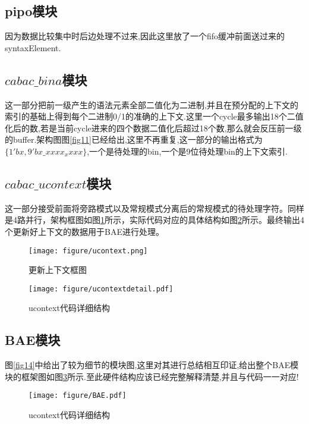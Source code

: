 \documentclass[UTF8,a4paper,12pt]{ctexart}
\begin{document}
\subsection{pipo模块}
因为数据比较集中时后边处理不过来,因此这里放了一个fifo缓冲前面送过来的syntaxElement.

\subsection{$cabac\_bina$模块}
这一部分把前一级产生的语法元素全部二值化为二进制,并且在预分配的上下文的索引的基础上得到每个二进制0/1的准确的上下文.这里一个cycle最多输出18个二值化后的数,若是当前cycle进来的四个数据二值化后超过18个数,那么就会反压前一级的buffer.架构图图\ref{fig11}已经给出,这里不再重复,这一部分的输出格式为$\{1'bx,9'bx\_xxxx_xxxx\}$,一个是待处理的bin,一个是9位待处理bin的上下文索引.

\subsection{$cabac\_ucontext$模块}
这一部分接受前面将旁路模式以及常规模式分离后的常规模式的待处理字符。同样是4路并行，架构框图如图\ref{fig15}所示，实际代码对应的具体结构如图\ref{fig16}所示。最终输出4个更新好上下文的数据用于BAE进行处理。
\begin{figure}[H]
\centering
\texttt{[image: figure/ucontext.png]}
\caption{更新上下文框图}\label{fig15}
\end{figure}

\begin{figure}[H]
\centering
\texttt{[image: figure/ucontextdetail.pdf]}
\caption{ucontext代码详细结构}\label{fig16}
\end{figure}

\subsection{BAE模块}
图\ref{fig14}中给出了较为细节的模块图,这里对其进行总结相互印证,给出整个BAE模块的框架图如图\ref{fig17}所示.至此硬件结构应该已经完整解释清楚,并且与代码一一对应!
\begin{figure}[H]
\centering
\texttt{[image: figure/BAE.pdf]}
\caption{ucontext代码详细结构}\label{fig17}
\end{figure}
\end{document}
